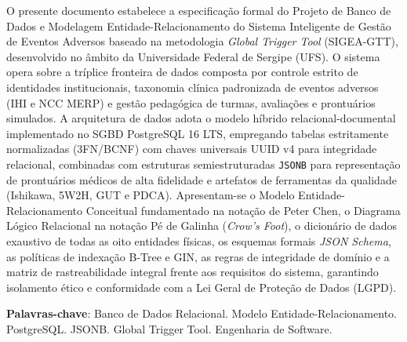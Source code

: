 \begin{resumo}
O presente documento estabelece a especificação formal do Projeto de Banco de Dados e Modelagem Entidade-Relacionamento do Sistema Inteligente de Gestão de Eventos Adversos baseado na metodologia \textit{Global Trigger Tool} (SIGEA-GTT), desenvolvido no âmbito da Universidade Federal de Sergipe (UFS). O sistema opera sobre a tríplice fronteira de dados composta por controle estrito de identidades institucionais, taxonomia clínica padronizada de eventos adversos (IHI e NCC MERP) e gestão pedagógica de turmas, avaliações e prontuários simulados. A arquitetura de dados adota o modelo híbrido relacional-documental implementado no SGBD PostgreSQL 16 LTS, empregando tabelas estritamente normalizadas (3FN/BCNF) com chaves universais UUID v4 para integridade relacional, combinadas com estruturas semiestruturadas \texttt{JSONB} para representação de prontuários médicos de alta fidelidade e artefatos de ferramentas da qualidade (Ishikawa, 5W2H, GUT e PDCA). Apresentam-se o Modelo Entidade-Relacionamento Conceitual fundamentado na notação de Peter Chen, o Diagrama Lógico Relacional na notação Pé de Galinha (\textit{Crow's Foot}), o dicionário de dados exaustivo de todas as oito entidades físicas, os esquemas formais \textit{JSON Schema}, as políticas de indexação B-Tree e GIN, as regras de integridade de domínio e a matriz de rastreabilidade integral frente aos requisitos do sistema, garantindo isolamento ético e conformidade com a Lei Geral de Proteção de Dados (LGPD).

\vspace{\onelineskip}
\noindent
\textbf{Palavras-chave}: Banco de Dados Relacional. Modelo Entidade-Relacionamento. PostgreSQL. JSONB. Global Trigger Tool. Engenharia de Software.
\end{resumo}
